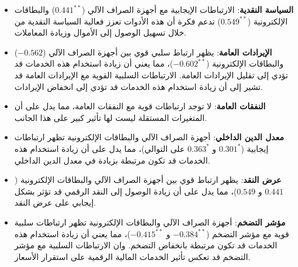 \documentclass[10pt,a4paper]{report}
\begin{document}
\begin{doublespacing}
\begin{enumerate}
\begin{itemize}
	\item \textbf{السياسة النقدية}: 
	الارتباطات الإيجابية مع أجهزة الصراف الآلي ($0.441^{**}$) والبطاقات الإلكترونية ($0.549^{**}$) تدعم فكرة أن هذه الأدوات تعزز فعالية السياسة النقدية من خلال تسهيل الوصول إلى الأموال وزيادة المعاملات.
	
	\item \textbf{الإيرادات العامة}: 
	يظهر ارتباط سلبي قوي بين أجهزة الصراف الآلي ($-0.562$) والبطاقات الإلكترونية ($-0.602^{**}$)، مما يعني أن زيادة استخدام هذه الخدمات قد تؤدي إلى تقليل الإيرادات العامة. الارتباطات السلبية القوية مع الإيرادات العامة قد تشير إلى أن زيادة استخدام هذه الخدمات قد تؤدي إلى انخفاض الإيرادات.
	
	\item \textbf{النفقات العامة}: 
	لا توجد ارتباطات قوية مع النفقات العامة، مما يدل على أن المتغيرات المستقلة ليست لها تأثير كبير على هذا الجانب.
	
	\item \textbf{معدل الدين الداخلي}: 
	أجهزة الصراف الآلي والبطاقات الإلكترونية تظهر ارتباطات إيجابية ($0.301^*$ و $0.363^*$ على التوالي)، مما يدل على أن زيادة استخدام هذه الخدمات قد تكون مرتبطة بزيادة في معدل الدين الداخلي.
	
	\item \textbf{عرض النقد}: 
	يظهر ارتباط قوي بين أجهزة الصراف الآلي والبطاقات الإلكترونية ($0.441$ و $0.549$)، مما يدل على أن زيادة الوصول إلى النقد الرقمي قد تؤثر بشكل إيجابي على عرض النقد.
	
	\item \textbf{مؤشر التضخم}: 
	أجهزة الصراف الآلي والبطاقات الإلكترونية تظهر ارتباطات سلبية قوية مع مؤشر التضخم ($-0.384^{**}$ و $-0.415^{**}$)، مما يعني أن زيادة استخدام هذه الخدمات قد تكون مرتبطة بانخفاض التضخم. وان الارتباطات السلبية مع مؤشر التضخم قد تعكس تأثير الخدمات المالية الرقمية على استقرار الأسعار.
	

\end{itemize}
\end{enumerate}
\end{doublespacing}
\end{document}
